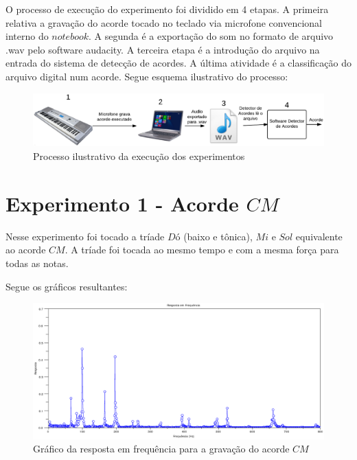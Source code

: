 O processo de execução do experimento foi dividido em 4 etapas. A primeira relativa a gravação do acorde tocado no teclado via microfone convencional interno do $notebook$. A segunda é a exportação do som no formato de arquivo .wav pelo software audacity. A terceira etapa é a introdução do arquivo na entrada do sistema de detecção de acordes. A última atividade é a classificação do arquivo digital num acorde. Segue esquema ilustrativo do processo:

\begin{figure}[h]
	\centering
		\includegraphics[keepaspectratio=true,scale=0.35]{figuras/processo_experimento.eps}
	\caption{Processo ilustrativo da execução dos experimentos}
\end{figure}

\newpage
\section{Experimento 1 - Acorde $CM$}
\label{sec:experimento1}

Nesse experimento foi tocado a tríade $Dó$ (baixo e tônica), $Mi$ e $Sol$ equivalente ao acorde $CM$. A tríade foi tocada ao mesmo tempo e com a mesma força para todas as notas.

Segue os gráficos resultantes:

\begin{figure}[h]
	\centering
		\includegraphics[keepaspectratio=true,scale=0.49]{figuras/CM/fft_cm.eps}
	\caption{Gráfico da resposta em frequência para a gravação do acorde $CM$}
\end{figure}

